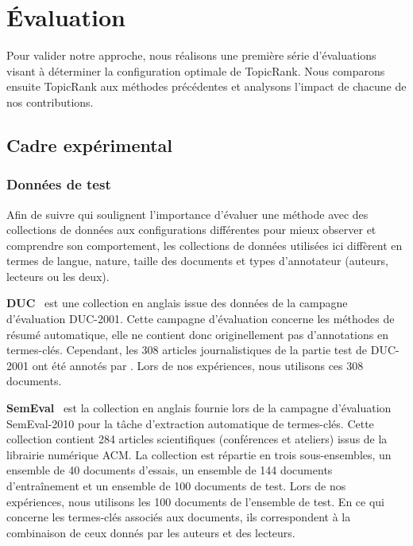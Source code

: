 \section{Évaluation}
\label{sec:evaluation}
  Pour valider notre approche, nous réalisons une première série d'évaluations
  visant à déterminer la configuration optimale de TopicRank. Nous comparons 
  ensuite TopicRank aux méthodes précédentes et analysons l'impact de chacune de
  nos contributions.

  \subsection{Cadre expérimental}
  \label{subsec:cadre_experimental}
    \subsubsection{Données de test}
    \label{subsubsec:donnees_de_test}
      Afin de suivre  qui soulignent l'importance
      d'évaluer une méthode avec des collections de données aux configurations
      différentes pour mieux observer et comprendre son comportement, les
      collections de données utilisées ici diffèrent en termes de langue,
      nature, taille des documents et types d'annotateur (auteurs, lecteurs ou
      les deux).

      \textbf{DUC}~\cite{over2001duc} est une collection en anglais issue des
      données de la campagne d'évaluation DUC-2001. Cette campagne d'évaluation
      concerne les méthodes de résumé automatique, elle ne contient donc
      originellement pas d'annotations en termes-clés. Cependant, les 308
      articles journalistiques de la partie test de DUC-2001 ont été annotés par
      . Lors de nos expériences, nous utilisons ces
      308 documents.

      \textbf{SemEval}~\cite{kim2010semeval} est la collection en anglais
      fournie lors de la campagne d'évaluation SemEval-2010 pour la tâche
      d'extraction automatique de termes-clés. Cette collection contient 284
      articles scientifiques (conférences et ateliers) issus de la librairie
      numérique ACM. La collection est répartie en trois sous-ensembles, un
      ensemble de 40 documents d'essais, un ensemble de 144 documents
      d'entraînement et un ensemble de 100 documents de test. Lors de nos
      expériences, nous utilisons les 100 documents de l'ensemble de test. En ce
      qui concerne les termes-clés associés aux documents, ils correspondent à
      la combinaison de ceux donnés par les auteurs et des lecteurs.

